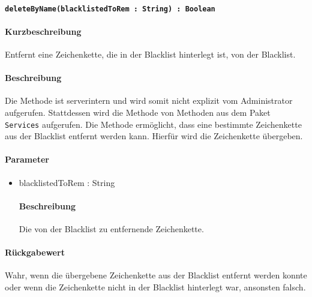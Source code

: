 \paragraph{\texttt{deleteByName(blacklistedToRem : String) : Boolean}}%
\paragraph*{Kurzbeschreibung}
Entfernt eine Zeichenkette, die in der Blacklist hinterlegt ist, von der Blacklist.
\paragraph*{Beschreibung}
Die Methode ist serverintern und wird somit nicht explizit vom Administrator aufgerufen.
Stattdessen wird die Methode von Methoden aus dem Paket \texttt{Services} aufgerufen.
Die Methode ermöglicht, dass eine bestimmte Zeichenkette aus der Blacklist entfernt werden kann.
Hierfür wird die Zeichenkette übergeben.
\paragraph*{Parameter}
\begin{itemize}
    \item blacklistedToRem : String
    		\paragraph*{Beschreibung}
    		Die von der Blacklist zu entfernende Zeichenkette.
\end{itemize}
\paragraph*{Rückgabewert}
Wahr, wenn die übergebene Zeichenkette aus der Blacklist entfernt werden konnte oder wenn die Zeichenkette nicht in der Blacklist hinterlegt war, ansonsten falsch.
